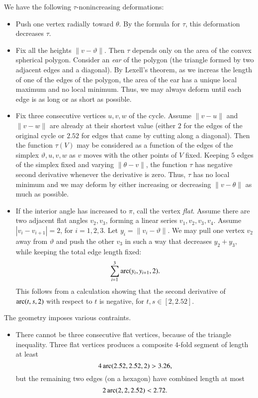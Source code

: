We have the following $\tau$-nonincreasing deformations:
\begin{itemize}
\item Push one vertex radially toward $\theta$.  By the formula for $\tau$, this deformation decreases $\tau$.
\item Fix all the heights $\|v-\vartheta\|$. Then $\tau$ depends only on the area of the convex spherical polygon.  Consider an {\it ear} of the polygon (the triangle formed by two adjacent edges and a diagonal).  By Lexell's theorem, as we increas the length of one of the edges of the polygon, the area of the ear has a unique local maximum and no local minimum.  Thus, we may always deform until each edge is as long or as short as possible.
\item Fix three consecutive vertices $u,v,w$ of the cycle.
Assume $\|v-u\|$ and $\|v-w\|$ are already at their shortest value (either $2$ for the edges of the original cycle or $2.52$ for edges that came by cutting along a diagonal).  Then the function $\tau(V)$ may be considered as a function
of the edges of the simplex $\vartheta,u,v,w$ as $v$ moves with the other points of $V$ fixed.  Keeping $5$ edges of the simplex fixed and varying $\|\theta-v\|$, the function $\tau$ has negative second derivative whenever the derivative is zero.  Thus, $\tau$ has no local minimum and we may deform by either increasing or decreasing $\|v-\theta\|$ as much as possible.
\item If the interior angle has increased to $\pi$, call the vertex {\it flat}.  Assume there are two adjacent flat angles $v_2,v_3$, forming a linear series $v_1,v_2,v_3,v_4$.
Assume $|v_i-v_{i+1}|=2$, for $i=1,2,3$.
Let $y_i = \|v_i-\vartheta\|$.
We may pull one vertex $v_2$ away from $\vartheta$ and push the other $v_3$ in such a way that decreases $y_2+y_3$, while keeping the total edge length fixed:
  $$
  \sum_{i=1}^3\operatorname{arc}(y_i,y_{i+1},2).
  $$
This follows from a calculation showing that the second derivative of $\operatorname{arc}(t,s,2)$ with respect to $t$ is negative, for $t,s\in[2,2.52]$.
\end{itemize}

The geometry imposes various contraints.
\begin{itemize}
\item There cannot be three consecutive flat vertices, because of the triangle inequality.  Three flat vertices produces a composite $4$-fold segment of length at least
$$
4\operatorname{arc}(2.52,2.52,2) > 3.26,
$$
but the remaining two edges (on a hexagon) have combined length at most
$$
2\operatorname{arc}(2,2,2.52) < 2.72.
$$
\end{itemize}

